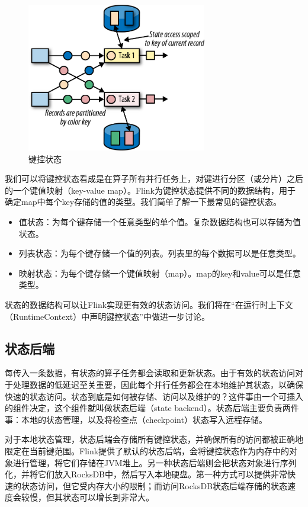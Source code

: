 \documentclass[cn,11pt,chinese]{elegantbook}
\begin{document}
\begin{figure}[htbp]
    \centering
    \includegraphics[width=0.7\textwidth]{images/spaf_0312.png}
    \caption{键控状态}
\end{figure}

我们可以将键控状态看成是在算子所有并行任务上，对键进行分区（或分片）之后的一个键值映射（key-value map）。Flink为键控状态提供不同的数据结构，用于确定map中每个key存储的值的类型。我们简单了解一下最常见的键控状态。

\begin{itemize}
    \item 值状态：为每个键存储一个任意类型的单个值。复杂数据结构也可以存储为值状态。
    \item 列表状态：为每个键存储一个值的列表。列表里的每个数据可以是任意类型。
    \item 映射状态：为每个键存储一个键值映射（map）。map的key和value可以是任意类型。
\end{itemize}

状态的数据结构可以让Flink实现更有效的状态访问。我们将在“在运行时上下文（RuntimeContext）中声明键控状态”中做进一步讨论。

\subsection{状态后端}

每传入一条数据，有状态的算子任务都会读取和更新状态。由于有效的状态访问对于处理数据的低延迟至关重要，因此每个并行任务都会在本地维护其状态，以确保快速的状态访问。状态到底是如何被存储、访问以及维护的？这件事由一个可插入的组件决定，这个组件就叫做状态后端（state backend）。状态后端主要负责两件事：本地的状态管理，以及将检查点（checkpoint）状态写入远程存储。

对于本地状态管理，状态后端会存储所有键控状态，并确保所有的访问都被正确地限定在当前键范围。Flink提供了默认的状态后端，会将键控状态作为内存中的对象进行管理，将它们存储在JVM堆上。另一种状态后端则会把状态对象进行序列化，并将它们放入RocksDB中，然后写入本地硬盘。第一种方式可以提供非常快速的状态访问，但它受内存大小的限制；而访问RocksDB状态后端存储的状态速度会较慢，但其状态可以增长到非常大。
\end{document}
